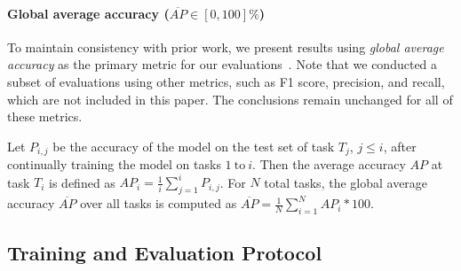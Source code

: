 


\paragraph*{Global average accuracy ($\overline{AP} \in [0, 100]\%$)}
To maintain consistency with prior work, we present results using \emph{global average accuracy} as the primary metric for our evaluations~\cite{continual-learning-malware, BIR, icarl}. Note that we conducted a subset of evaluations using other metrics, such as F1 score, precision, and recall, which are not included in this paper. The conclusions remain unchanged for all of these metrics.

Let $P_{i,j}$ be the accuracy of the model on the test set
of task $T_j$, $j \leq i$, after 
continually training the model on tasks $1~\text{to}~i$. Then the average accuracy $AP$ at task $T_i$ is defined as $AP_i = \frac{1}{i} \sum_{j=1}^i P_{i,j}$. For $N$ total tasks, the global average accuracy $\overline{AP}$ over all tasks is computed as $\overline{AP} = \frac{1}{N} \sum_{i=1}^{N} AP_i * 100$.









\subsection{Training and Evaluation Protocol}

